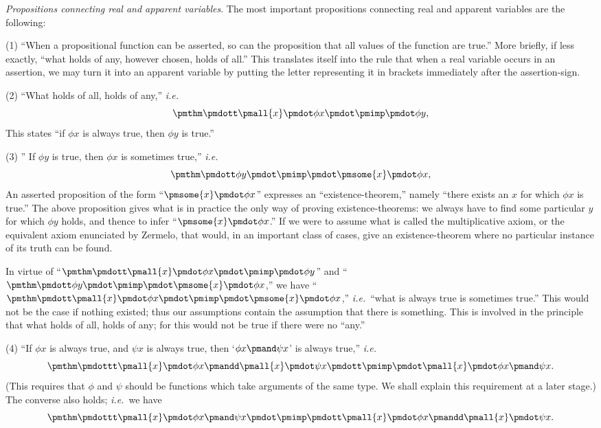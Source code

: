 \documentclass[letterpaper,12pt,openany,leqno]{book}
\newcommand{\pagefirst}[1]{\marginnote[\boxed{\text{#1}}]{\boxed{\text{#1}}}}
\begin{document}
\textit{Propositions connecting real and apparent variables}. The most important propositions connecting real and apparent variables are the following:

(1) ``When a propositional function can be asserted, so can the proposition that all values of the function are true.'' More briefly, if less exactly, ``what holds of any, however chosen, holds of all.'' This translates itself into the rule that when a real variable occurs in an assertion, we may turn it into an apparent variable by putting the letter representing it in brackets immediately after the assertion-sign.

(2) ``What holds of all, holds of any,'' \textit{i.e.}\
\[ 
	\pmthm\pmdott \pmall{x}\pmdot \phi x \pmdot \pmimp \pmdot \phi y,
\]
This states ``if $\phi x$ is always true, then $\phi y$ is true.''

(3) '' If $\phi y$ is true, then $\phi x$ is sometimes true,'' \textit{i.e.}\
\[ 
	\pmthm\pmdott \phi y \pmdot \pmimp \pmdot \pmsome{x}\pmdot \phi x,
\]
An asserted proposition of the form ``$\pmsome{x}\pmdot\phi x$'' expresses an ``existence-theorem,'' namely ``there exists an $x$ for which $\phi x$ is true.'' The above proposition gives what is in practice the only way of proving existence-theorems: we always have to find some particular $y$ for which $\phi y$ holds, and thence to infer ``$\pmsome{x} \pmdot \phi x$.'' If we were to assume what is called the multiplicative axiom, or the equivalent axiom enunciated by Zermelo, that would, in an important class of cases, give an existence-theorem where no particular instance of its truth can be found.

In virtue of ``$\pmthm \pmdott \pmall{x}\pmdot \phi x \pmdot\pmimp\pmdot \phi y$'' and ``$\pmthm \pmdott \phi y \pmdot \pmimp\pmdot \pmsome{x} \pmdot \phi x$,'' we have ``$\pmthm \pmdott \pmall{x}\pmdot \phi x \pmdot \pmimp \pmdot \pmsome{x} \pmdot \phi x$,'' \textit{i.e.}\ ``what is always true is sometimes true.'' This would not be the case if nothing existed; thus our assumptions contain the assumption that there is something. This is involved in the principle \pagefirst{21} that what holds of all, holds of any; for this would not be true if there were no ``any.''

(4) ``If $\phi x$ is always true, and $\psi x$ is always true, then `$\phi x \pmand \psi x$' is always true,'' \textit{i.e.}\
\[ 
	\pmthm\pmdottt \pmall{x}\pmdot \phi x \pmandd \pmall{x}\pmdot \psi x \pmdott \pmimp \pmdot \pmall{x}\pmdot \phi x \pmand \psi x.
\]
(This requires that $\phi$ and $\psi$ should be functions which take arguments of the same type. We shall explain this requirement at a later stage.) The converse also holds; \textit{i.e.}\ we have
\[ 
	\pmthm\pmdottt \pmall{x}\pmdot \phi x \pmand \psi x \pmdot \pmimp \pmdott \pmall{x}\pmdot \phi x \pmandd \pmall{x}\pmdot \psi x.
\]
\end{document}
